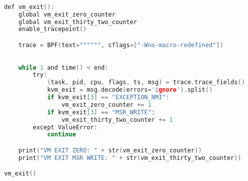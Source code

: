\documentclass{report}
\begin{document}
\begin{spacing}{1.5}
\begin{lstlisting}[caption={Source Code of VM-EXIT Counter},captionpos=b,language=c,firstnumber=1]
        
        
def vm_exit():
    global vm_exit_zero_counter
    global vm_exit_thirty_two_counter
    enable_tracepoint()

    trace = BPF(text="""""", cflags=["-Wno-macro-redefined"])
    
    
    while 1 and time() < end:
        try:
            (task, pid, cpu, flags, ts, msg) = trace.trace_fields()
            kvm_exit = msg.decode(errors='ignore').split()
            if kvm_exit[3] == "EXCEPTION_NMI":
                vm_exit_zero_counter += 1
            if kvm_exit[3] == "MSR_WRITE":
                vm_exit_thirty_two_counter += 1
        except ValueError:
            continue

    print("VM EXIT ZERO: " + str(vm_exit_zero_counter))
    print("VM EXIT MSR WRITE: " + str(vm_exit_thirty_two_counter))

vm_exit()
\end{lstlisting}



\end{spacing}
\end{document}
